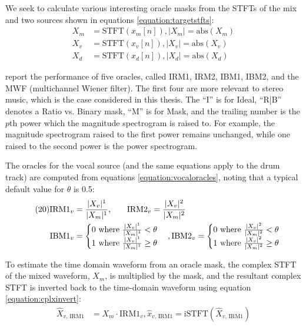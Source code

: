 \documentclass[report.tex]{subfiles}
\begin{document}
We seek to calculate various interesting oracle masks from the STFTs of the mix and two sources shown in equations \eqref{equation:targetstfts}:
\begin{align}\tag{19}\label{equation:targetstfts}
	\nonumber X_{m} &= \text{STFT}(x_{m}[n]), |X_{m}| = \text{abs}(X_{m})\\
	\nonumber X_{v} &= \text{STFT}(x_{v}[n]), |X_{v}| = \text{abs}(X_{v})\\
	\nonumber X_{d} &= \text{STFT}(x_{d}[n]), |X_{d}| = \text{abs}(X_{d})
\end{align}
 
\textcite{sisec2018} report the performance of five oracles, called IRM1, IRM2, IBM1, IBM2, and the MWF (multichannel Wiener filter). The first four are more relevant to stereo music, which is the case considered in this thesis. The ``I'' is for Ideal, ``R|B'' denotes a Ratio vs. Binary mask, ``M'' is for Mask, and the trailing number is the $p$th power which the magnitude spectrogram is raised to. For example, the magnitude spectrogram raised to the first power remains unchanged, while one raised to the second power is the power spectrogram.

The oracles for the vocal source (and the same equations apply to the drum track) are computed from equations \eqref{equation:vocaloracles}, noting that a typical default value for $\theta$ is 0.5:
\begin{align}\tag{20}\label{equation:vocaloracles}
	\nonumber \text{IRM1}_{v} &= \frac{|X_{v}|^{1}}{|X_{m}|^{1}}\text{,\qquad}
	\nonumber \text{IRM2}_{v} = \frac{|X_{v}|^{2}}{|X_{m}|^{2}}\\
	\nonumber \text{IBM1}_{v} &= \begin{cases}
		0 \text{ where } \frac{|X_{v}|^{1}}{|X_{m}|^{1}} < \theta\\
		1 \text{ where } \frac{|X_{v}|^{1}}{|X_{m}|^{1}} \ge \theta
	\end{cases},
	\nonumber \text{IBM2}_{v} = \begin{cases}
		0 \text{ where } \frac{|X_{v}|^{2}}{|X_{m}|^{2}} < \theta\\
		1 \text{ where } \frac{|X_{v}|^{2}}{|X_{m}|^{2}} \ge \theta
	\end{cases}
\end{align}

To estimate the time domain waveform from an oracle mask, the complex STFT of the mixed waveform, $X_{m}$, is multiplied by the mask, and the resultant complex STFT is inverted back to the time-domain waveform using equation \eqref{equation:cplxinvert}:
\begin{align}\tag{21}\label{equation:cplxinvert}
	\nonumber \hat{X}_{v\text{, IRM1}} &= X_{m} \cdot \text{IRM1}_{v}, \hat{x}_{v\text{, IRM1}} = \text{iSTFT}(\hat{X}_{v\text{, IRM1}})
\end{align}
\end{document}
